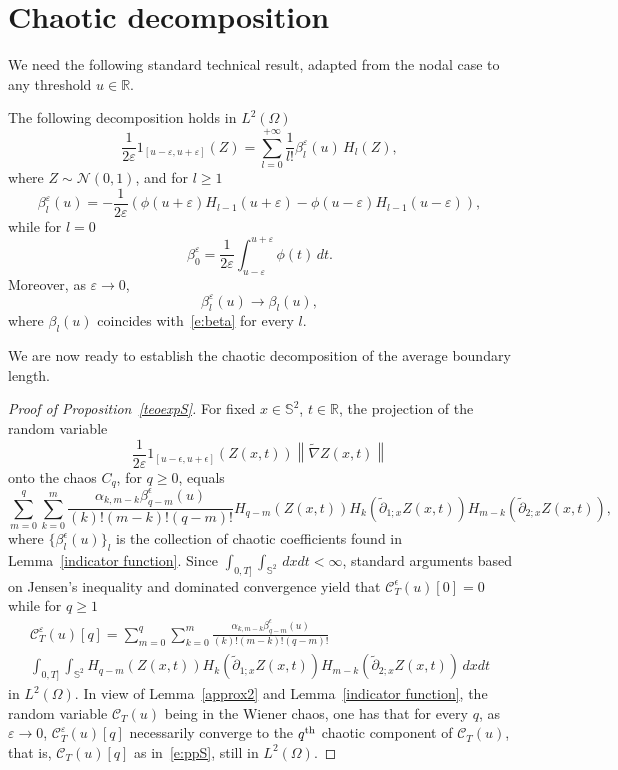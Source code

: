 \documentclass[AHL,Unicode,longabstracts,published]{cedram}
\newcommand{\clC}{\mathcal{C}}
\newcommand{\clN}{\mathcal{N}}
\newcommand{\bbS}{\mathbb{S}}
\newcommand{\bbR}{\mathbb{R}}
\begin{document}
\section{Chaotic decomposition}\label{app-chaos}

We need the following standard technical result, adapted from the nodal case \cite{MPRW16} to any threshold $u\in \bbR$.

\begin{lemm}\label{indicator function}
The following decomposition holds in $L^2(\Omega)$
\begin{equation*}
\frac{1}{2\varepsilon}{1}_{[u-\varepsilon,u+\varepsilon]}(Z)=\sum_{l=0}^{+\infty }\frac{1}{l!}\beta_l^{\varepsilon}(u)\,H_{l}(Z),
\end{equation*}
where $Z\sim \clN(0,1)$, and for $l \geq 1$
\[
\beta_l^{\varepsilon}(u)=-\frac{1}{2\varepsilon}\left (
\phi \left (u+\varepsilon \right) H_{l-1} \left (u+\varepsilon \right)-
\phi \left (u-\varepsilon \right) H_{l-1} \left (u-\varepsilon \right) \right),
\]
while for $l=0$
\[
\beta_0^{\varepsilon} = \frac{1}{2\varepsilon} \int_{u-\varepsilon}^{u+\varepsilon} \phi(t)\,dt.
\]
Moreover, as $\varepsilon\to 0$,
\[
\beta_{l}^\varepsilon(u) \to \beta_l(u),
\]
where $\beta_l(u)$ coincides with~\eqref{e:beta} for every $l$.
\end{lemm}

We are now ready to establish the chaotic decomposition of the average boundary length.

\begin{proof}[Proof of Proposition~\ref{teoexpS}]
For fixed $x\in \bbS^2$, $t\in \bbR$, the projection of the random variable
\[
\frac{1}{2\varepsilon} 1_{[u-\epsilon, u+\epsilon]}(Z(x,t)) \left\|\widetilde \nabla Z(x,t)\right\|
\]
onto the chaos $C_{q}$, for $q\geq 0$, equals
\[
\sum_{m=0}^{q}\sum_{k=0}^{m} \frac{\alpha _{k,m-k}\beta^\epsilon _{q-m}(u)}{(k)!(m-k)!(q-m)!} H_{q-m}(Z(x,t))H_{k}\left(\widetilde\partial_{1;x} Z(x,t)\right)H_{m-k}\left(\widetilde{\partial}_{2;x} Z(x,t)\right),
\]
where $\{\beta_l^\epsilon(u)\}_l$ is the collection of chaotic coefficients found in Lemma~\ref{indicator function}. Since $\int_{0,T]}\int_{\bbS^2}\,dxdt<\infty$, standard arguments based on Jensen's inequality and dominated convergence yield that $\clC_T^\epsilon(u)[0] = 0$ while for $q\ge 1$
\begin{multline*}
\clC_T^{\varepsilon}(u)[q]= \sum_{m=0}^{q}\sum_{k=0}^{m} \frac{\alpha _{k,m-k}\beta^\epsilon _{q-m}(u)}{ (k)!(m-k)!(q-m)!} \\
\int_{0,T]}\int_{\bbS^2} H_{q-m}(Z(x,t))H_{k}\left(\widetilde\partial_{1;x} Z(x,t)\right)H_{m-k}\left(\widetilde{\partial} _{2;x} Z(x,t)\right)\,dx dt
\end{multline*}
in $L^2(\Omega)$. In view of Lemma~\ref{approx2} and Lemma~\ref{indicator function}, the random variable $\clC_T(u)$ being in the Wiener chaos, one has that for every $q$, as $\varepsilon \to 0$, $\clC_T^\varepsilon(u)[q]$ necessarily converge to the $q^{\rm th}$ chaotic component of $\clC_T(u)$, that is, $\clC_T(u)[q]$ as in~\eqref{e:ppS}, still in $L^2(\Omega)$.
\end{proof}




\end{document}
